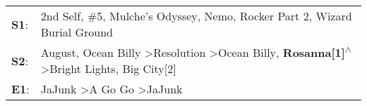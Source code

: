 \begin{supertabular}{p{0.03\textwidth}p{0.92\textwidth}}
 \textbf{S1}:  &                                                                 2nd Self\textsuperscript{}, \enspace \#5\textsuperscript{}, \enspace Mulche's Odyssey\textsuperscript{}, \enspace Nemo\textsuperscript{}, \enspace Rocker Part 2\textsuperscript{}, \enspace Wizard Burial Ground\textsuperscript{}  \enspace  \\
 \textbf{S2}:  &  August\textsuperscript{}, \enspace Ocean Billy\textsuperscript{} \textgreater \enspace Resolution\textsuperscript{} \textgreater \enspace Ocean Billy\textsuperscript{}, \enspace \textbf{Rosanna[1]\textsuperscript{$\wedge$}} \textgreater \enspace Bright Lights, Big City[2]\textsuperscript{}  \enspace  \\
 \textbf{E1}:  &                                                                                                                                                                             JaJunk\textsuperscript{} \textgreater \enspace A Go Go\textsuperscript{} \textgreater \enspace JaJunk\textsuperscript{}  \enspace  \\
\end{supertabular}
